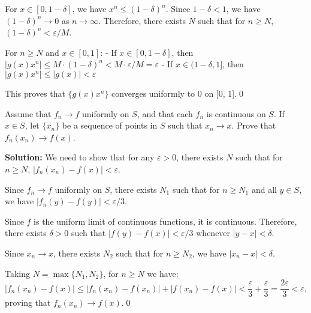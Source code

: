 For \( x \in [0, 1 - \delta] \), we have \( x^n \leq (1 - \delta)^n \). Since \( 1 - \delta < 1 \), we have \( (1 - \delta)^n \to 0 \) as \( n \to \infty \). Therefore, there exists \( N \) such that for \( n \geq N \), \( (1 - \delta)^n < \varepsilon/M \).

For \( n \geq N \) and \( x \in [0, 1] \):
- If \( x \in [0, 1 - \delta] \), then \( |g(x)x^n| \leq M \cdot (1 - \delta)^n < M \cdot \varepsilon/M = \varepsilon \)
- If \( x \in (1 - \delta, 1] \), then \( |g(x)x^n| \leq |g(x)| < \varepsilon \)

This proves that \( \{g(x)x^n\} \) converges uniformly to 0 on [0, 1].\qed


\begin{problembox}
Assume that \( f_n \to f \) uniformly on \( S \), and that each \( f_n \) is continuous on \( S \). If \( x \in S \), let \( \{x_n\} \) be a sequence of points in \( S \) such that \( x_n \to x \). Prove that \( f_n(x_n) \to f(x) \).
\end{problembox}

\noindent\textbf{Solution:} We need to show that for any \( \varepsilon > 0 \), there exists \( N \) such that for \( n \geq N \), \( |f_n(x_n) - f(x)| < \varepsilon \).

Since \( f_n \to f \) uniformly on \( S \), there exists \( N_1 \) such that for \( n \geq N_1 \) and all \( y \in S \), we have \( |f_n(y) - f(y)| < \varepsilon/3 \).

Since \( f \) is the uniform limit of continuous functions, it is continuous. Therefore, there exists \( \delta > 0 \) such that \( |f(y) - f(x)| < \varepsilon/3 \) whenever \( |y - x| < \delta \).

Since \( x_n \to x \), there exists \( N_2 \) such that for \( n \geq N_2 \), we have \( |x_n - x| < \delta \).

Taking \( N = \max\{N_1, N_2\} \), for \( n \geq N \) we have:
\[|f_n(x_n) - f(x)| \leq |f_n(x_n) - f(x_n)| + |f(x_n) - f(x)| < \frac{\varepsilon}{3} + \frac{\varepsilon}{3} = \frac{2\varepsilon}{3} < \varepsilon,\]
proving that \( f_n(x_n) \to f(x) \).\qed


